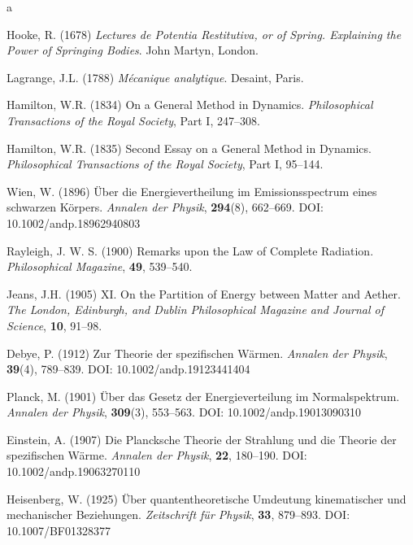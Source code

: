 \documentclass[11pt,a4paper,spanish]{book}
\begin{document}
\begin{thebibliography}{a}


 Hooke, R. (1678) \emph{Lectures de Potentia Restitutiva, or of Spring. Explaining the Power of Springing Bodies}. John Martyn, London.

 Lagrange, J.L. (1788) \emph{Mécanique analytique}. Desaint, Paris.

 Hamilton, W.R. (1834) On a General Method in Dynamics. \textit{Philosophical Transactions of the Royal Society}, Part I, 247--308.

 Hamilton, W.R. (1835) Second Essay on a General Method in Dynamics. \textit{Philosophical Transactions of the Royal Society}, Part I, 95--144.

 Wien, W. (1896) Über die Energievertheilung im Emissionsspectrum eines schwarzen Körpers. \textit{Annalen der Physik}, \textbf{294}(8), 662--669. DOI: 10.1002/andp.18962940803

 Rayleigh, J. W. S. (1900) Remarks upon the Law of Complete Radiation. \textit{Philosophical Magazine}, \textbf{49}, 539--540.

 Jeans, J.H. (1905) XI. On the Partition of Energy between Matter and Aether. \textit{The London, Edinburgh, and Dublin Philosophical Magazine and Journal of Science}, \textbf{10}, 91--98.

 Debye, P. (1912) Zur Theorie der spezifischen Wärmen. \textit{Annalen der Physik}, \textbf{39}(4), 789--839. DOI: 10.1002/andp.19123441404



 Planck, M. (1901) Über das Gesetz der Energieverteilung im Normalspektrum. \textit{Annalen der Physik}, \textbf{309}(3), 553--563. DOI: 10.1002/andp.19013090310

 Einstein, A. (1907) Die Plancksche Theorie der Strahlung und die Theorie der spezifischen Wärme. \textit{Annalen der Physik}, \textbf{22}, 180--190. DOI: 10.1002/andp.19063270110

 Heisenberg, W. (1925) Über quantentheoretische Umdeutung kinematischer und mechanischer Beziehungen. \textit{Zeitschrift für Physik}, \textbf{33}, 879--893. DOI: 10.1007/BF01328377


\end{thebibliography}
\end{document}

